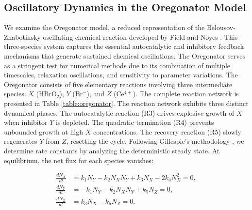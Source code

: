 \documentclass[review,onefignum,onetabnum]{siamart171218}
\begin{document}
\subsection{Oscillatory Dynamics in the Oregonator Model}

We examine the Oregonator model, a reduced representation of the Belousov-Zhabotinsky oscillating chemical reaction developed by Field and Noyes \cite{field_noyes}. This three-species system captures the essential autocatalytic and inhibitory feedback mechanisms that generate sustained chemical oscillations. The Oregonator serves as a stringent test for numerical methods due to its combination of multiple timescales, relaxation oscillations, and sensitivity to parameter variations. The Oregonator consists of five elementary reactions involving three intermediate species: $X$ (HBrO$_2$), $Y$ (Br$^-$), and $Z$ (Ce$^{4+}$). The complete reaction network is presented in Table \ref{table:oregonator}. The reaction network exhibits three distinct dynamical phases. The autocatalytic reaction (R3) drives explosive growth of $X$ when inhibitor $Y$ is depleted. The quadratic termination (R4) prevents unbounded growth at high $X$ concentrations. The recovery reaction (R5) slowly regenerates $Y$ from $Z$, resetting the cycle. Following Gillespie's methodology \cite{Gillespie1977}, we determine rate constants by analyzing the deterministic steady state. At equilibrium, the net flux for each species vanishes:

\begin{align}
\frac{dN_X}{dt} &= k_1 N_Y - k_2 N_X N_Y + k_3 N_X - 2k_4 N_X^2 = 0, \\
\frac{dN_Y}{dt} &= -k_1 N_Y - k_2 N_X N_Y + k_5 N_Z = 0, \\
\frac{dN_Z}{dt} &= k_3 N_X - k_5 N_Z = 0.
\end{align}
\end{document}
